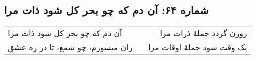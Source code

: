 \begin{center}
\section*{شماره ۶۴: آن دم که چو بحر کل شود ذات مرا}
\label{sec:064}
\begin{longtable}{l p{0.5cm} r}
آن دم که چو بحر کل شود ذات مرا
&&
روزن گردد جملهٔ ذرات مرا
\\
زان میسوزم، چو شمع، تا در ره عشق
&&
یک وقت شود جملهٔ اوقات مرا
\\
\end{longtable}
\end{center}
